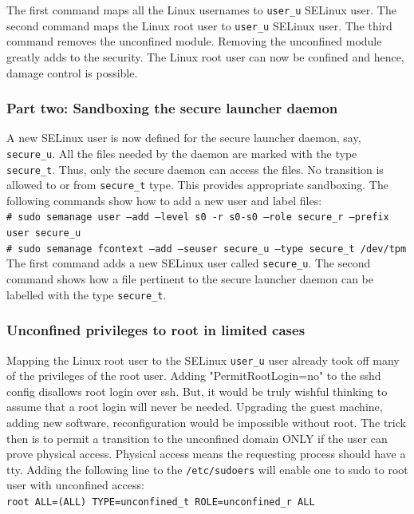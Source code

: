 \documentclass[10pt,twocolumn,pdftex]{article}
\begin{document}
The first command maps all the Linux usernames to {\tt user\_u} SELinux user. The second command maps the Linux root user to {\tt user\_u} SELinux user.  The third command removes the unconfined module. Removing the unconfined module greatly adds to the security. The Linux root user can now be confined and hence, damage control is possible.

\subsubsection{Part two: Sandboxing the secure launcher daemon}
A new SELinux user is now defined for the secure launcher daemon, say, {\tt secure\_u}. All the files needed by the daemon are marked with the type {\tt secure\_t}. Thus, only the secure daemon can access the files. No transition is allowed to or from {\tt secure\_t} type. This provides appropriate sandboxing. The following commands show how to add a new user and label files: \\
{\tt \# sudo semanage user --add --level s0 -r s0-s0 --role secure\_r --prefix user secure\_u}\\
{\tt \# sudo semanage fcontext --add --seuser secure\_u --type secure\_t /dev/tpm}\\

The first command adds a new SELinux user called {\tt secure\_u}. The second command shows how a file pertinent to the secure launcher daemon can be labelled with the type {\tt secure\_t}. 

\subsubsection{Unconfined privileges to root in limited cases}
Mapping the Linux root user to the SELinux {\tt user\_u} user already took off many of the privileges of the root user. Adding "PermitRootLogin=no" to the sshd config disallows root login over ssh. But, it would be truly wishful thinking to assume that a root login will never be needed. Upgrading the guest machine, adding new software, reconfiguration would be impossible without root. The trick then is to permit a transition to the unconfined domain ONLY if the user can prove physical access. Physical access means the requesting process should have a tty. Adding the following line to the {\tt /etc/sudoers} will enable one to sudo to root user with unconfined access: \\

{\tt root ALL=(ALL) TYPE=unconfined\_t ROLE=unconfined\_r ALL} \\
\end{document}
